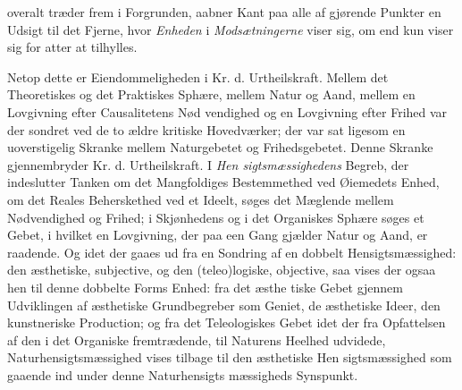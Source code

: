overalt træder frem i Forgrunden, aabner Kant paa alle af\-%
gjørende Punkter en Udsigt til det Fjerne, hvor \emph{Enheden} i
\emph{Modsætningerne} viser sig, om end kun viser sig for atter
at tilhylles.

Netop dette er Eiendommeligheden i Kr. d. Urtheilskraft.
Mellem det Theoretiskes og det Praktiskes Sphære, mellem
Natur og Aand, mellem en Lovgivning efter Causalitetens Nød\-%
vendighed og en Lovgivning efter Frihed var der sondret ved
de to ældre kritiske Hovedværker; der var sat ligesom en
uoverstigelig Skranke mellem Naturgebetet og Frihedsgebetet.
Denne Skranke gjennembryder Kr. d. Urtheilskraft. I \emph{Hen\-%
sigtsmæssighedens} Begreb, der indeslutter Tanken om det
Mangfoldiges Bestemmethed ved Øiemedets Enhed, om det
Reales Beherskethed ved et Ideelt, søges det Mæglende mellem
Nødvendighed og Frihed; i Skjønhedens og i det Organiskes
Sphære søges et Gebet, i hvilket en Lovgivning, der paa een
Gang gjælder Natur og Aand, er raadende. Og idet der gaaes
ud fra en Sondring af en dobbelt Hensigtsmæssighed: den
æsthetiske, subjective, og den (teleo)logiske, objective, saa vises
der ogsaa hen til denne dobbelte Forms Enhed: fra det æsthe\-%
tiske Gebet gjennem Udviklingen af æsthetiske Grundbegreber
som Geniet, de æsthetiske Ideer, den kunstneriske Production;
og fra det Teleologiskes Gebet idet der fra Opfattelsen af den
i det Organiske fremtrædende, til Naturens Heelhed udvidede,
Naturhensigtsmæssighed vises tilbage til den æsthetiske Hen\-%
sigtsmæssighed som gaaende ind under denne Naturhensigts\-%
mæssigheds Synspunkt.

